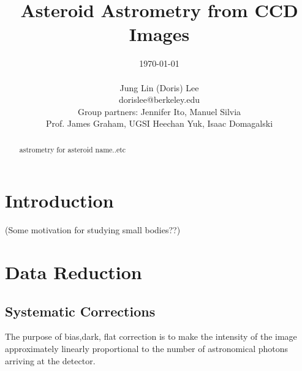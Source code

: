 \documentclass[authoryear, 12pt,5p, times]{elsarticle}
\begin{document}
\begin{frontmatter}
\title{Asteroid Astrometry from CCD Images}
\author{\today \\ \quad \\Jung Lin (Doris) Lee\\ dorislee@berkeley.edu\\Group partners: Jennifer Ito, Manuel Silvia\\Prof. James Graham, UGSI Heechan Yuk, Isaac Domagalski}
	\begin{abstract}
astrometry for asteroid name..etc
	\end{abstract}
\end{frontmatter}
\section{Introduction}
(Some motivation for studying small bodies??) 
\section{Data Reduction}
	
	\subsection{Systematic  Corrections}
The purpose of bias,dark, flat correction is to make the intensity of the image approximately linearly proportional to the number of astronomical photons arriving at the detector.
\end{document}
